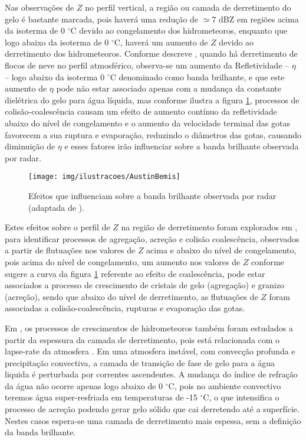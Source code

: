 Nas observações de $Z$ no perfil vertical, a região ou camada de derretimento do gelo é bastante marcada, pois haverá uma redução de $\simeq$7 dBZ em regiões acima da isoterma de 0 $^{\circ}$C devido ao congelamento dos hidrometeoros, enquanto que logo abaixo da isoterma de 0 $^{\circ}$C, haverá um aumento de $Z$ devido ao derretimento dos hidrometeoros. Conforme descreve , quando há derretimento de flocos de neve no perfil atmosférico, observa-se um aumento da Refletividade -- $\eta$ -- logo abaixo da isoterma 0 $^{\circ}$C denominado como banda brilhante, e que este aumento de $\eta$ pode não estar associado apenas com a mudança da constante dielétrica do gelo para água líquida, mas conforme ilustra a figura \ref{Austin},  processos de colisão-coalescência causam um efeito de aumento contínuo da refletividade abaixo do nível de congelamento e o aumento da velocidade terminal das gotas favorecem a sua ruptura e evaporação, reduzindo o diâmetros das gotas, causando diminuição de $\eta$ e esses fatores irão influenciar sobre a banda brilhante observada por radar.

\begin{figure}[ht]
\centering
\texttt{[image: img/ilustracoes/AustinBemis]}
\caption{Efeitos que influenciam sobre a banda brilhante observada por radar (adaptada de ).}
\label{Austin}
\end{figure}

Estes efeitos sobre o perfil de $Z$ na região de derretimento  foram explorados em , para identificar processos de agregação, acreção e colisão coalescência, observados a partir de flutuações nos valores de $Z$ acima e abaixo do nível de congelamento, pois acima do nível de congelamento, um aumento nos valores de $Z$ conforme sugere a curva da figura \ref{Austin} referente ao efeito de coalescência, pode estar associados a processo de crescimento de cristais de gelo (agregação) e granizo (acreção), sendo que abaixo do nível de derretimento, as flutuações de $Z$ foram associadas a colisão-coalescência, rupturas e evaporação das gotas. 

Em , os processos de crescimentos de hidrometeoros também foram estudados a partir da espessura da camada de derretimento, pois está relacionada com o lapse-rate da atmosfera \cite[p.~462]{austin1950,mason1971_2ed}. Em uma atmosfera instável, com convecção profunda e precipitação convectiva, a camada de transição de fase de gelo para a água liquida é perturbada por correntes ascendentes. A mudança do índice de refração da água não ocorre apenas logo abaixo de 0 $^{\circ}$C, pois no ambiente convectivo teremos água super-resfriada em temperaturas de -15 $^{\circ}$C, o que intensifica o processo de acreção podendo gerar gelo sólido que cai derretendo até a superfície. Nestes casos espera-se uma camada de derretimento mais espessa, sem a definição da banda brilhante. 

